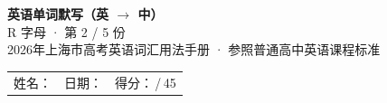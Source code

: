 \documentclass[10pt,a4paper]{article}
\begin{document}
\pagestyle{plain}

\begin{center}
{\LARGE\bfseries 英语单词默写（英 $\to$ 中）}\\[0.22em]
{\large R 字母 · 第 2 / 5 份}\\[0.18em]
{\small 2026年上海市高考英语词汇用法手册 · 参照普通高中英语课程标准}
\end{center}

\vspace{0.25em}
\noindent\begin{tabular}{@{}p{}@{}p{}@{}p{}@{}}
姓名：\underline{\hspace{2.0cm}} & 日期：\underline{\hspace{2.0cm}} & 得分：\underline{\hspace{1.3cm}}\,/\,45 \\
\end{tabular}

\vspace{0.3em}

\vspace{0.08em}
\end{document}
